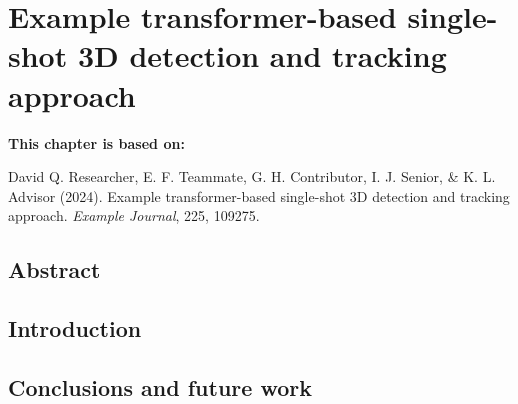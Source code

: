 \chapter[Example transformer-based single-shot 3D detection and tracking approach]{Example transformer-based single-shot 3D detection and tracking approach}
\label{cha:chapter4}
\vspace*{\fill}
\textbf{This chapter is based on:}

David Q. Researcher, E. F. Teammate, G. H. Contributor, I. J. Senior, \& K. L. Advisor (2024). Example transformer-based single-shot 3D detection and tracking approach. \textit{Example Journal}, 225, 109275.
\newpage

\section*{Abstract}
\lipsum[1]

\newpage

\section{Introduction}

\lipsum[1-3]

\section{Conclusions and future work} 
\lipsum[4]